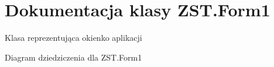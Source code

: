 \hypertarget{class_z_s_t_1_1_form1}{}\section{Dokumentacja klasy Z\+S\+T.\+Form1}
\label{class_z_s_t_1_1_form1}


Klasa reprezentująca okienko aplikacji  




Diagram dziedziczenia dla Z\+S\+T.\+Form1
